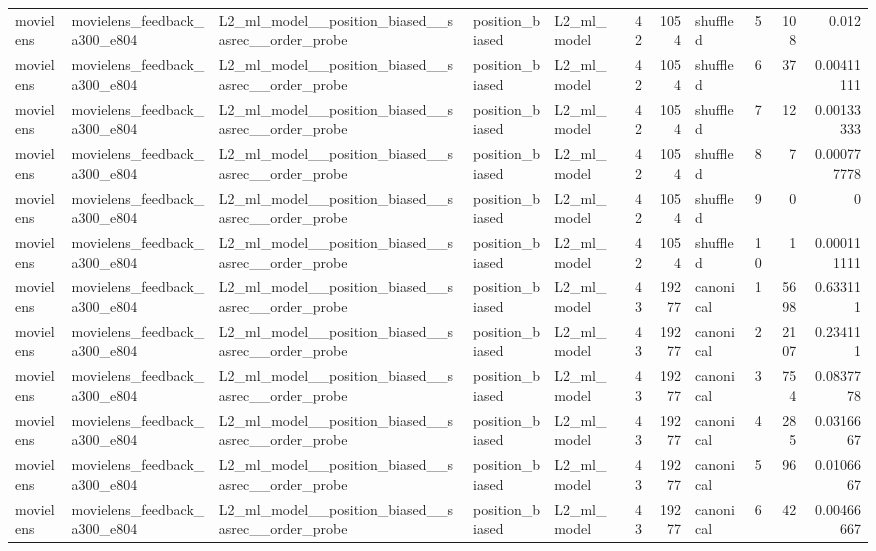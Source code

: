 \begin{table}[htbp!]
\begin{tabular}{lllllrrlrrr}
movielens & movielens\_feedback\_a300\_e804 & L2\_ml\_model\_\_position\_biased\_\_sasrec\_\_order\_probe & position\_biased & L2\_ml\_model & 42 & 1054 & shuffled & 5 & 108 & 0.012 \\
movielens & movielens\_feedback\_a300\_e804 & L2\_ml\_model\_\_position\_biased\_\_sasrec\_\_order\_probe & position\_biased & L2\_ml\_model & 42 & 1054 & shuffled & 6 & 37 & 0.00411111 \\
movielens & movielens\_feedback\_a300\_e804 & L2\_ml\_model\_\_position\_biased\_\_sasrec\_\_order\_probe & position\_biased & L2\_ml\_model & 42 & 1054 & shuffled & 7 & 12 & 0.00133333 \\
movielens & movielens\_feedback\_a300\_e804 & L2\_ml\_model\_\_position\_biased\_\_sasrec\_\_order\_probe & position\_biased & L2\_ml\_model & 42 & 1054 & shuffled & 8 & 7 & 0.000777778 \\
movielens & movielens\_feedback\_a300\_e804 & L2\_ml\_model\_\_position\_biased\_\_sasrec\_\_order\_probe & position\_biased & L2\_ml\_model & 42 & 1054 & shuffled & 9 & 0 & 0 \\
movielens & movielens\_feedback\_a300\_e804 & L2\_ml\_model\_\_position\_biased\_\_sasrec\_\_order\_probe & position\_biased & L2\_ml\_model & 42 & 1054 & shuffled & 10 & 1 & 0.000111111 \\
movielens & movielens\_feedback\_a300\_e804 & L2\_ml\_model\_\_position\_biased\_\_sasrec\_\_order\_probe & position\_biased & L2\_ml\_model & 43 & 19277 & canonical & 1 & 5698 & 0.633111 \\
movielens & movielens\_feedback\_a300\_e804 & L2\_ml\_model\_\_position\_biased\_\_sasrec\_\_order\_probe & position\_biased & L2\_ml\_model & 43 & 19277 & canonical & 2 & 2107 & 0.234111 \\
movielens & movielens\_feedback\_a300\_e804 & L2\_ml\_model\_\_position\_biased\_\_sasrec\_\_order\_probe & position\_biased & L2\_ml\_model & 43 & 19277 & canonical & 3 & 754 & 0.0837778 \\
movielens & movielens\_feedback\_a300\_e804 & L2\_ml\_model\_\_position\_biased\_\_sasrec\_\_order\_probe & position\_biased & L2\_ml\_model & 43 & 19277 & canonical & 4 & 285 & 0.0316667 \\
movielens & movielens\_feedback\_a300\_e804 & L2\_ml\_model\_\_position\_biased\_\_sasrec\_\_order\_probe & position\_biased & L2\_ml\_model & 43 & 19277 & canonical & 5 & 96 & 0.0106667 \\
movielens & movielens\_feedback\_a300\_e804 & L2\_ml\_model\_\_position\_biased\_\_sasrec\_\_order\_probe & position\_biased & L2\_ml\_model & 43 & 19277 & canonical & 6 & 42 & 0.00466667 \\

\end{tabular}
\end{table}
